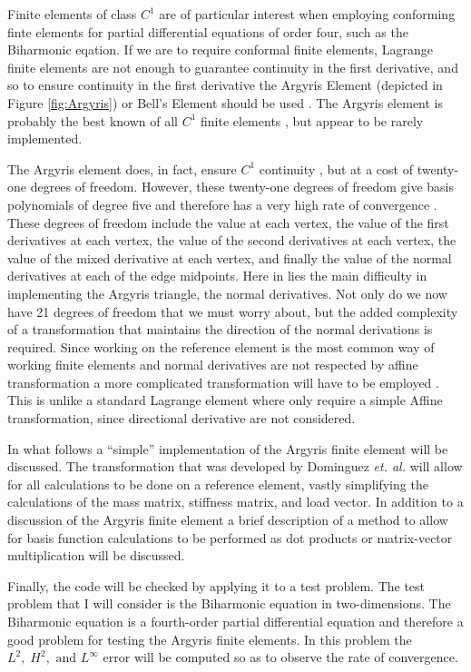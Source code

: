 Finite elements of class $C^1$ are of particular interest when employing
conforming finte elements for partial differential equations of order four, such
as the Biharmonic eqation. If we are to require conformal finite elements,
Lagrange finite elements are not enough to guarantee continuity in the first
derivative, and so to ensure continuity in the first derivative the Argyris
Element (depicted in Figure \ref{fig:Argyris}) or Bell's Element should
be used \cite{Johnson}. The Argyris element is probably the best known of all
$C^1$ finite elements \cite{Argyris,DominguezA}, but appear to be rarely
implemented. 



The Argyris element does, in fact, ensure $C^1$ continuity
\cite{DominguezA,Okabe}, but at a cost of twenty-one degrees of freedom.
However, these twenty-one degrees of freedom give basis polynomials of degree
five and therefore has a very high rate of convergence \cite{DominguezA}. These
degrees of freedom include the value at each vertex, the value of the first
derivatives at each vertex, the value of the second derivatives at each vertex,
the value of the mixed derivative at each vertex, and finally the value of the
normal derivatives at each of the edge midpoints. Here in lies the main
difficulty in implementing the Argyris triangle, the normal derivatives. Not
only do we now have 21 degrees of freedom that we must worry about, but the
added complexity of a transformation that maintains the direction of the normal
derivations is required. Since working on the reference element is the most
common way of working finite elements and normal derivatives are not respected
by affine transformation a more complicated transformation will have to be
employed \cite{DominguezA}. This is unlike a standard Lagrange element where
only require a simple Affine transformation, since directional derivative are
not considered.

In what follows a ``simple'' implementation of the Argyris finite element will
be discussed. The transformation that was developed by Dominguez \emph{et. al.}
will allow for all calculations to be done on a reference element, vastly
simplifying the calculations of the mass matrix, stiffness matrix, and load
vector. In addition to a discussion of the Argyris finite element a brief
description of a method to allow for basis function calculations to be performed
as dot products or matrix-vector multiplication will be discussed.

Finally, the code will be checked by applying it to a test problem. The test
problem that I will consider is the Biharmonic equation in two-dimensions. The
Biharmonic equation is a fourth-order partial differential equation and
therefore a good problem for testing the Argyris finite elements. In this
problem the $L^2,\; H^2,\text{ and } L^{\infty}$ error will be computed so as to
observe the rate of convergence.
